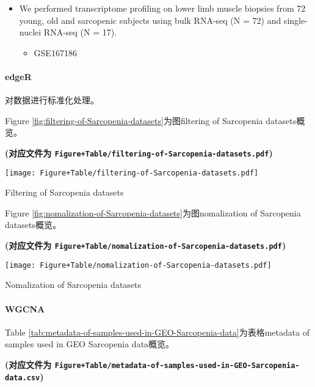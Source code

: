 \documentclass[
]{article}
\providecommand{\tightlist}{%
  \setlength{\itemsep}{0pt}\setlength{\parskip}{0pt}}
\begin{document}
\begin{itemize}
\tightlist
\item
  We performed transcriptome profiling on lower limb muscle biopsies from 72 young, old and sarcopenic subjects using bulk RNA-seq (N = 72) and single-nuclei RNA-seq (N = 17).

  \begin{itemize}
  \tightlist
  \item
    GSE167186
  \end{itemize}
\end{itemize}

\hypertarget{edger}{%
\paragraph{edgeR}\label{edger}}

对数据进行标准化处理。

Figure \ref{fig:filtering-of-Sarcopenia-datasets}为图filtering of Sarcopenia datasets概览。

\textbf{(对应文件为 \texttt{Figure+Table/filtering-of-Sarcopenia-datasets.pdf})}

\def\@captype{figure}
\begin{center}
\texttt{[image: Figure+Table/filtering-of-Sarcopenia-datasets.pdf]}
\caption{Filtering of Sarcopenia datasets}\label{fig:filtering-of-Sarcopenia-datasets}
\end{center}

Figure \ref{fig:nomalization-of-Sarcopenia-datasets}为图nomalization of Sarcopenia datasets概览。

\textbf{(对应文件为 \texttt{Figure+Table/nomalization-of-Sarcopenia-datasets.pdf})}

\def\@captype{figure}
\begin{center}
\texttt{[image: Figure+Table/nomalization-of-Sarcopenia-datasets.pdf]}
\caption{Nomalization of Sarcopenia datasets}\label{fig:nomalization-of-Sarcopenia-datasets}
\end{center}

\hypertarget{wgcna}{%
\paragraph{WGCNA}\label{wgcna}}

Table \ref{tab:metadata-of-samples-used-in-GEO-Sarcopenia-data}为表格metadata of samples used in GEO Sarcopenia data概览。

\textbf{(对应文件为 \texttt{Figure+Table/metadata-of-samples-used-in-GEO-Sarcopenia-data.csv})}
\end{document}
